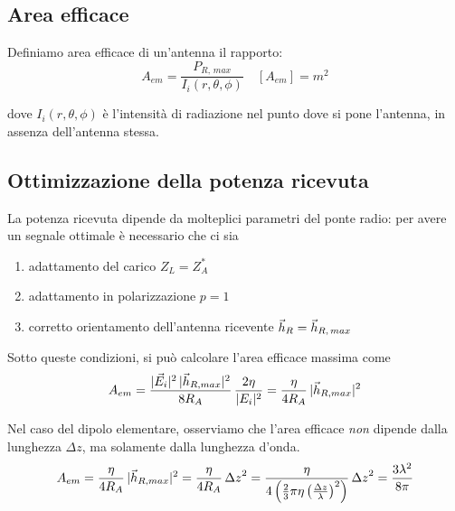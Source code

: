\subsection{Area efficace}
Definiamo area efficace di un'antenna il rapporto:
\begin{equation}\label{eq:Aeff}
	A_{em}=\frac{P_{R,\, max}}{I_i(r,\theta,\phi)} \quad [A_{em}] = m^2
\end{equation}

dove $I_i(r,\theta,\phi)$ è l'intensità di radiazione nel punto dove si pone l'antenna, in assenza dell'antenna stessa.


\subsection{Ottimizzazione della potenza ricevuta}
La potenza ricevuta dipende da molteplici parametri del ponte radio: per avere un segnale ottimale è necessario che ci sia

\begin{enumerate}
	\item adattamento del carico \hfill $Z_L = Z_A^*$
	\item adattamento in polarizzazione \hfill  $p = 1$
	\item corretto orientamento dell'antenna ricevente \hfill $\vec{h}_R = \vec{h}_{R,\, max}$
\end{enumerate}

Sotto queste condizioni, si può calcolare l'area efficace massima come
\begin{equation*}
	A_{em}
	= \frac{|\vec{E}_i|^2 \, |\vec{h}_{R, max}|^2}{8 R_A} \, \frac{2\eta}{|E_i|^2}
	= \frac{\eta}{4 R_A} \, |\vec{h}_{R, max}|^2
\end{equation*}

Nel caso del dipolo elementare, osserviamo che l'area efficace \emph{non} dipende dalla lunghezza $\Delta z$, ma solamente dalla lunghezza d'onda.
\begin{equation*}
	A_{em}
	= \frac{\eta}{4 R_A} \, |\vec{h}_{R, max}|^2
	= \frac{\eta}{4 R_A} \, {\Delta z}^2
	= \frac{\eta}{4 \left(
			\frac{2}{3} \pi \eta \left(
				\frac{\Delta z}{\lambda}
			\right)^2
		\right)} \, {\Delta z}^2
	= \frac{3 \lambda^2}{8\pi}
\end{equation*}

